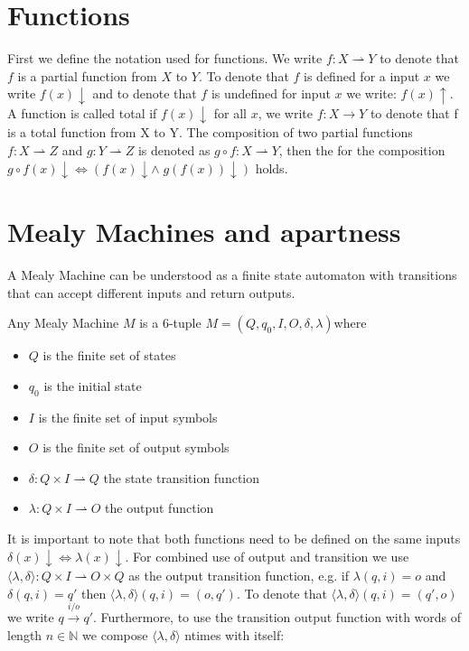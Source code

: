 \section{Functions}
First we define the notation used for functions. We write $f:X\rightharpoonup Y$ to denote that $f$ is a partial function from $X$ to $Y$. To denote that $f$ is defined for a input $x$ we write $f(x)\downarrow$ and to denote that $f$ is undefined for input $x$ we write: $f(x)\uparrow$. 
A function is called total if $f(x)\downarrow$ for all $x$, we write $f:X\rightarrow Y$ to denote that f is a total function from X to Y. The composition of two partial functions $f:X\rightharpoonup Z$ and $g:Y\rightharpoonup Z$ is denoted as $g\circ f:X\rightharpoonup Y$, then the for the composition $g\circ f(x)\downarrow\iff (f(x)\downarrow \land\; g(f(x))\downarrow)$ holds. 

\section{Mealy Machines and apartness}
A Mealy Machine can be understood as a finite state automaton with transitions that can accept different inputs and return outputs. 
\begin{definition}\label{def:Mealy}
	 Any Mealy Machine $M$ is a 6-tuple $M=(Q,q_0,I,O,\delta,\lambda)$where 
\begin{itemize}[itemsep=-8pt, topsep=-20pt]
	\item $Q$ is the finite set of states 
	\item $q_0$ is the initial state 
	\item $I$ is the finite set of input symbols
	\item $O$ is the finite set of output symbols
	\item $\delta :Q\times I\rightharpoonup Q$ the state transition function 
	\item $\lambda :Q\times I\rightharpoonup O$ the output function 
\end{itemize}
\end{definition}
It is important to note that both functions need to be defined on the same inputs $\delta(x)\downarrow\iff\lambda(x)\downarrow$. For combined use of output and transition we use $\langle\lambda,\delta\rangle:Q\times I\rightharpoonup O\times Q$ as the output transition function, e.g. if $\lambda(q,i)=o$ and $\delta(q,i)=q'$ then $\langle\lambda,\delta\rangle(q,i)=(o,q')$. 
 To denote that $\langle\lambda,\delta\rangle(q,i)=(q',o)$ we write $q\xrightarrow{i/o}q'$. Furthermore, to use the transition output function with words of length $n\in\mathbb{N}$ we compose $\langle\lambda,\delta\rangle$ ntimes with itself: 
 
